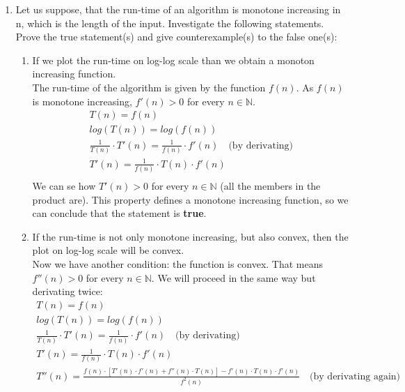 \documentclass[12pt,english]{article}
\begin{document}
\begin{enumerate}
	\item Let us suppose, that the run-time of an algorithm is monotone increasing in n, which is the length of the input. Investigate the following statements. Prove the true statement(s) and give counterexample(s) to the false one(s):
	\begin{enumerate}
		\item If we plot the run-time on log-log scale than we obtain a monoton increasing function.\\

		The run-time of the algorithm is given by the function $f(n)$. As $f(n)$ is monotone increasing, $f'(n)>0$ for every $n \in \mathbb{N}$.
		\begin{gather*}
			T(n) = f(n)\\
			log(T(n)) = log(f(n))\\
			\frac{1}{T(n)} \cdot T'(n) = \frac{1}{f(n)} \cdot f'(n) \quad\text{(by derivating)}\\
			T'(n) = \frac{1}{f(n)} \cdot T(n) \cdot f'(n)\\
		\end{gather*}
		We can se how $T'(n)>0$ for every $n \in \mathbb{N}$ (all the members in the product are). This property defines a monotone increasing function, so we can conclude that the statement is \textbf{true}.

		\item If the run-time is not only monotone increasing, but also convex, then the plot on log-log scale will be convex.\\

		Now we have another condition: the function is convex. That means $f''(n)>0$ for every $n \in \mathbb{N}$. We will proceed in the same way but derivating twice:
		\begin{gather*}
			T(n) = f(n)\\
			log(T(n)) = log(f(n))\\
			\frac{1}{T(n)} \cdot T'(n) = \frac{1}{f(n)} \cdot f'(n) \quad\text{(by derivating)}\\
			T'(n) = \frac{1}{f(n)} \cdot T(n) \cdot f'(n)\\
			T''(n) = \frac{f(n) \cdot [T'(n) \cdot f'(n) + f''(n) \cdot T(n)] - f'(n) \cdot T(n) \cdot f'(n)}{f^2(n)} \quad\text{(by derivating again)}\\
		\end{gather*}


\end{enumerate}
\end{enumerate}
\end{document}
